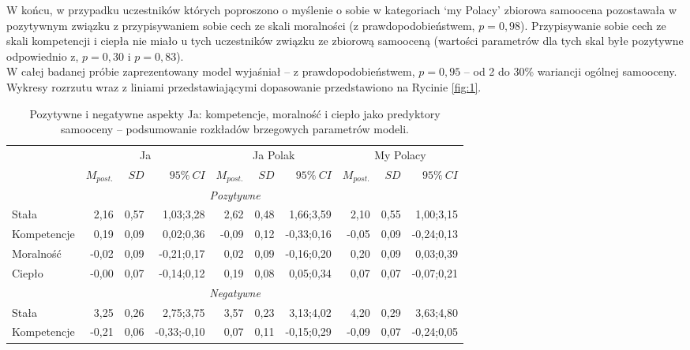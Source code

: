 \documentclass[man]{apa6}
\begin{document}
W końcu, w przypadku uczestników których poproszono o myślenie o sobie w kategoriach `my Polacy' zbiorowa samoocena pozostawała w pozytywnym związku z przypisywaniem sobie cech ze skali moralności (z prawdopodobieństwem, $p = 0,98$). Przypisywanie sobie cech ze skali kompetencji i ciepła nie miało u tych uczestników związku ze zbiorową samooceną (wartości parametrów dla tych skal byłe pozytywne odpowiednio z, $p = 0,30$ i $p = 0,83$).\\

W całej badanej próbie zaprezentowany model wyjaśniał -- z prawdopodobieństwem, $p = 0,95$ -- od 2 do 30\% wariancji ogólnej samooceny. Wykresy rozrzutu wraz z liniami przedstawiającymi dopasowanie przedstawiono na Rycinie \ref{fig:1}.\\

\begin{table*}[htbp]
\vspace*{2em}
\centering
\begin{threeparttable}
\caption{Pozytywne i negatywne aspekty Ja: kompetencje, moralność i ciepło jako predyktory samooceny -- podsumowanie rozkładów brzegowych parametrów modeli.}
\label{tab:1}
\bgroup
\def\tabcolsep{4pt}
\begin{tabular}{lrrrrrrrrr}
\midrule
 &
\multicolumn{3}{c}{Ja} &
\multicolumn{3}{c}{Ja Polak} &
\multicolumn{3}{c}{My Polacy} \\
\cline{2-10}
 & $M_{post.}$    & $SD$   & $95\%\ CI$   & $M_{post.}$    & $SD$   & $95\%\ CI$   & $M_{post.}$    & $SD$   & $95\%\ CI$   \\
\midrule
 \multicolumn{10}{c}{\emph{Pozytywne}}  \\
 Stała       &  2,16 & 0,57 &  1,03;3,28 &  2,62 & 0,48 &  1,66;3,59 &  2,10 & 0,55 &  1,00;3,15 \\
 Kompetencje &  0,19 & 0,09 &  0,02;0,36 & -0,09 & 0,12 & -0,33;0,16 & -0,05 & 0,09 & -0,24;0,13 \\
 Moralność   & -0,02 & 0,09 & -0,21;0,17 &  0,02 & 0,09 & -0,16;0,20 &  0,20 & 0,09 &  0,03;0,39 \\
 Ciepło      & -0,00 & 0,07 & -0,14;0,12 &  0,19 & 0,08 &  0,05;0,34 &  0,07 & 0,07 & -0,07;0,21 \\
 \multicolumn{10}{c}{\emph{Negatywne}}  \\
 Stała       &  3,25 & 0,26 &  2,75;3,75 &  3,57 & 0,23 &  3,13;4,02 &  4,20  & 0,29 & 3,63;4,80 \\
 Kompetencje & -0,21 & 0,06 & -0,33;-0,10 &  0,07 & 0,11 & -0,15;0,29 & -0,09 & 0,07 & -0,24;0,05 \\

\end{tabular}
\end{threeparttable}
\end{table*}
\end{document}
